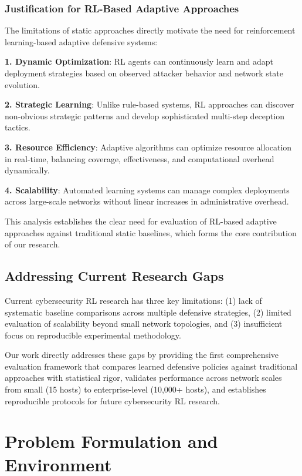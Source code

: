 \documentclass[12pt,oneside]{article}
\begin{document}
\subsubsection{Justification for RL-Based Adaptive Approaches}

The limitations of static approaches directly motivate the need for reinforcement learning-based adaptive defensive systems:

\textbf{1. Dynamic Optimization}: RL agents can continuously learn and adapt deployment strategies based on observed attacker behavior and network state evolution.

\textbf{2. Strategic Learning}: Unlike rule-based systems, RL approaches can discover non-obvious strategic patterns and develop sophisticated multi-step deception tactics.

\textbf{3. Resource Efficiency}: Adaptive algorithms can optimize resource allocation in real-time, balancing coverage, effectiveness, and computational overhead dynamically.

\textbf{4. Scalability}: Automated learning systems can manage complex deployments across large-scale networks without linear increases in administrative overhead.

This analysis establishes the clear need for evaluation of RL-based adaptive approaches against traditional static baselines, which forms the core contribution of our research.

\subsection{Addressing Current Research Gaps}

Current cybersecurity RL research has three key limitations: (1) lack of systematic baseline comparisons across multiple defensive strategies, (2) limited evaluation of scalability beyond small network topologies, and (3) insufficient focus on reproducible experimental methodology.

Our work directly addresses these gaps by providing the first comprehensive evaluation framework that compares learned defensive policies against traditional approaches with statistical rigor, validates performance across network scales from small (15 hosts) to enterprise-level (10,000+ hosts), and establishes reproducible protocols for future cybersecurity RL research.


\clearpage
\section{Problem Formulation and Environment}
\end{document}

